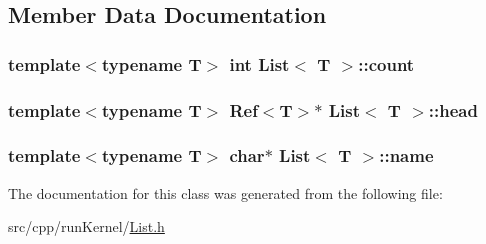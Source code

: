 \subsection{Member Data Documentation}
\hypertarget{class_list_a35f13d6f6507c65feeef85511db5c9cd}{
\subsubsection[{count}]{\setlength{\rightskip}{0pt plus 5cm}template$<$typename T$>$ int {\bf List}$<$ T $>$\-::count\hspace{0.3cm}{\ttfamily [private]}}}\label{class_list_a35f13d6f6507c65feeef85511db5c9cd}
\hypertarget{class_list_a90a2abb0e7387e864017347aa809c7ad}{
\subsubsection[{head}]{\setlength{\rightskip}{0pt plus 5cm}template$<$typename T$>$ {\bf Ref}$<$T$>$$\ast$ {\bf List}$<$ T $>$\-::head\hspace{0.3cm}{\ttfamily [private]}}}\label{class_list_a90a2abb0e7387e864017347aa809c7ad}
\hypertarget{class_list_a012ae91dba0327a5a7a433f4705f1b13}{
\subsubsection[{name}]{\setlength{\rightskip}{0pt plus 5cm}template$<$typename T$>$ char$\ast$ {\bf List}$<$ T $>$\-::name\hspace{0.3cm}{\ttfamily [private]}}}\label{class_list_a012ae91dba0327a5a7a433f4705f1b13}


The documentation for this class was generated from the following file\-:\begin{DoxyCompactItemize}
\item 
src/cpp/run\-Kernel/\hyperlink{_list_8h}{List.\-h}\end{DoxyCompactItemize}
